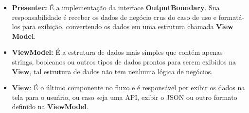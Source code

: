 \begin{itemize}
        \item \textbf{Presenter:} É a implementação da interface \textbf{OutputBoundary}. Sua responsabilidade é receber os dados de negócio crus do caso de uso e formatá-los para exibição, convertendo os dados em uma estrutura chamada \textbf{View Model}.
        
        
        \item \textbf{ViewModel:} É a estrutura de dados mais simples que contém apenas strings, booleanos ou outros tipos de dados prontos para serem exibidos na \textbf{View}, tal estrutura de dados não tem nenhuma lógica de negócios.
        
        
        \item \textbf{View}: É o último componente no fluxo e é responsável por exibir os dados na tela para o usuário, ou caso seja uma API, exibir o JSON ou outro formato definido na \textbf{ViewModel}.

    \end{itemize}
